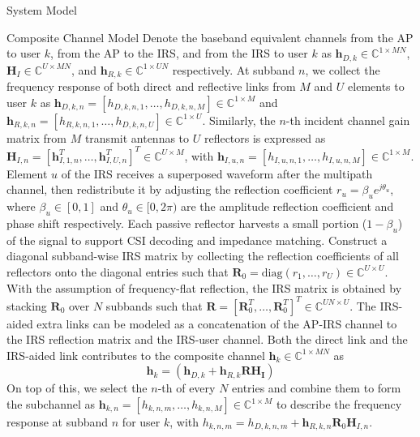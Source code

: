 \documentclass{IEEEtran}
\begin{document}
\begin{section} {System Model}
\begin{subsection} {Composite Channel Model}
		Denote the baseband equivalent channels from the AP to user $k$, from the AP to the IRS, and from the IRS to user $k$ as $\boldsymbol{h}_{D,k} \in \mathbb{C}^{1 \times MN}$, $\boldsymbol{H}_I \in \mathbb{C}^{U \times MN}$, and $\boldsymbol{h}_{R,k} \in \mathbb{C}^{1 \times UN}$ respectively. At subband $n$, we collect the frequency response of both direct and reflective links from $M$ and $U$ elements to user $k$ as $\boldsymbol{h}_{D,k,n}=[h_{D,k,n,1},\dots,h_{D,k,n,M}] \in \mathbb{C}^{1 \times M}$ and $\boldsymbol{h}_{R,k,n}=[h_{R,k,n,1},\dots,h_{D,k,n,U}] \in \mathbb{C}^{1 \times U}$. Similarly, the $n$-th incident channel gain matrix from $M$ transmit antennas to $U$ reflectors is expressed as $\boldsymbol{H}_{I,n}=[\boldsymbol{h}_{I,1,n}^T,\dots,\boldsymbol{h}_{I,U,n}^T]^T \in \mathbb{C}^{U \times M}$, with $\boldsymbol{h}_{I,u,n}=[h_{I,u,n,1},\dots,h_{I,u,n,M}] \in \mathbb{C}^{1 \times M}$. Element $u$ of the IRS receives a superposed waveform after the multipath channel, then redistribute it by adjusting the reflection coefficient $r_u = \beta_u e^{j \theta_u}$, where $\beta_u \in [0,1]$ and $\theta_u \in [0,2\pi)$ are the amplitude reflection coefficient and phase shift respectively. Each passive reflector harvests a small portion ($1 - \beta_u$) of the signal to support CSI decoding and impedance matching. Construct a diagonal subband-wise IRS matrix by collecting the reflection coefficients of all reflectors onto the diagonal entries such that $\boldsymbol{R}_0 = \text{diag}(r_1, \dots, r_U) \in \mathbb{C}^{U \times U}$. With the assumption of frequency-flat reflection, the IRS matrix is obtained by stacking $\boldsymbol{R}_0$ over $N$ subbands such that $\boldsymbol{R} = [\boldsymbol{R}_0^T,\dots,\boldsymbol{R}_0^T]^T \in \mathbb{C}^{UN \times U}$. The IRS-aided extra links can be modeled as a concatenation of the AP-IRS channel to the IRS reflection matrix and the IRS-user channel. Both the direct link and the IRS-aided link contributes to the composite channel $\boldsymbol{h}_k \in \mathbb{C}^{1 \times MN}$ as
		\begin{equation} \label{eq:h_k}
			\boldsymbol{h}_k = \left( \boldsymbol{h}_{D,k}+\boldsymbol{h}_{R,k} \boldsymbol{R} \boldsymbol{\boldsymbol{H}_I} \right)
		\end{equation}
		On top of this, we select the $n$-th of every $N$ entries and combine them to form the subchannel as $\boldsymbol{h}_{k,n}=[h_{k,n,m},\dots,h_{k,n,M}] \in \mathbb{C}^{1 \times M}$ to describe the frequency response at subband $n$ for user $k$, with $h_{k,n,m}=h_{D,k,n,m}+\boldsymbol{h}_{R,k,n}\boldsymbol{R}_0\boldsymbol{H}_{I,n}$.
	\end{subsection}


\end{section}
\end{document}
